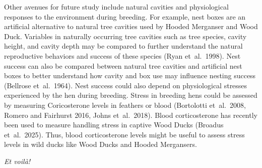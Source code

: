 Other avenues for future study include natural cavities and physiological responses to the environment during breeding. For example, nest boxes are an artificial alternative to natural tree cavities used by Hooded Merganser and Wood Duck. Variables in naturally occurring tree cavities such as tree species, cavity height, and cavity depth may be compared to further understand the natural reproductive behaviors and success of these species (Ryan et~al.~1998). Nest success can also be compared between natural tree cavities and artificial nest boxes to better understand how cavity and box use may influence nesting success (Bellrose et~al.~1964).  Nest success could also depend on physiological stresses experienced by the hen during breeding. Stress in breeding hens could be assessed by measuring Coricosterone levels in feathers or blood (Bortolotti et~al.~2008, Romero and Fairhurst 2016, Johns et~al.~2018). Blood corticosterone has recently been used to measure handling stress in captive Wood Ducks (Broadus et~al.~2025). Thus, blood corticosterone levels might be useful to assess stress levels in wild ducks like Wood Ducks and Hooded Mergansers.  

\bigskip

\noindent\textit{Et voilà!}

